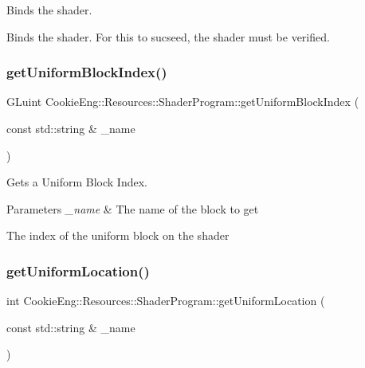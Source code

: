Binds the shader. 

Binds the shader. For this to sucseed, the shader must be verified. \mbox{\label{class_cookie_eng_1_1_resources_1_1_shader_program_a74c040878159bceefb0b6b125a8b3e87}} 
\subsubsection{\texorpdfstring{get\+Uniform\+Block\+Index()}{getUniformBlockIndex()}}
{\footnotesize\ttfamily G\+Luint Cookie\+Eng\+::\+Resources\+::\+Shader\+Program\+::get\+Uniform\+Block\+Index (\begin{DoxyParamCaption}\item[{const std\+::string \&}]{\+\_\+name }\end{DoxyParamCaption})}



Gets a Uniform Block Index. 


\begin{DoxyParams}{Parameters}
{\em \+\_\+name} & The name of the block to get\\
\hline
\end{DoxyParams}
The index of the uniform block on the shader \mbox{\label{class_cookie_eng_1_1_resources_1_1_shader_program_ae2fb823b3e8da3cf7154e0a8ffe25c85}} 
\subsubsection{\texorpdfstring{get\+Uniform\+Location()}{getUniformLocation()}}
{\footnotesize\ttfamily int Cookie\+Eng\+::\+Resources\+::\+Shader\+Program\+::get\+Uniform\+Location (\begin{DoxyParamCaption}\item[{const std\+::string \&}]{\+\_\+name }\end{DoxyParamCaption})}



